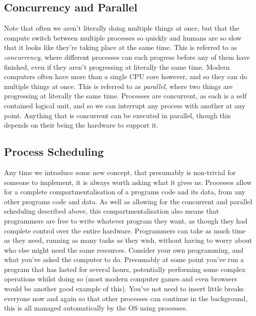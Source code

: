 \subsection{Concurrency and Parallel}

Note that often we aren't literally doing multiple things at once, but that the compute switch between multiple processes so quickly and humans are so slow that it looks like they're taking place at the same time. This is referred to as \textit{concurrency}, where different processes can each progress before any of them have finished, even if they aren't progressing at literally the same time. Modern computers often have more than a single CPU core however, and so they can do multiple things at once. This is referred to as \textit{parallel}, where two things are progressing at literally the same time. Processes are concurrent, as each is a self contained logical unit, and so we can interrupt any process with another at any point. Anything that is concurrent can be executed in parallel, though this depends on their being the hardware to support it.

\subsection{Process Scheduling}

Any time we introduce some new concept, that presumably is non-trivial for someone to implement, it is always worth asking what it gives us. Processes allow for a complete compartmentalisation of a programs code and its data, from any other programs code and data. As well as allowing for the concurrent and parallel scheduling described above, this compartmentalisation also means that programmers are free to write whatever program they want, as though they had complete control over the entire hardware. Programmers can take as much time as they need, running as many tasks as they wish, without having to worry about who else might need the same resources. Consider your own programming, and what you've asked the computer to do. Presumably at some point you've run a program that has lasted for several hours, potentially performing some complex operations whilst doing so (most modern computer games and even browsers would be another good example of this). You've not need to insert little breaks everyone now and again so that other processes can continue in the background, this is all managed automatically by the OS using processes. 

